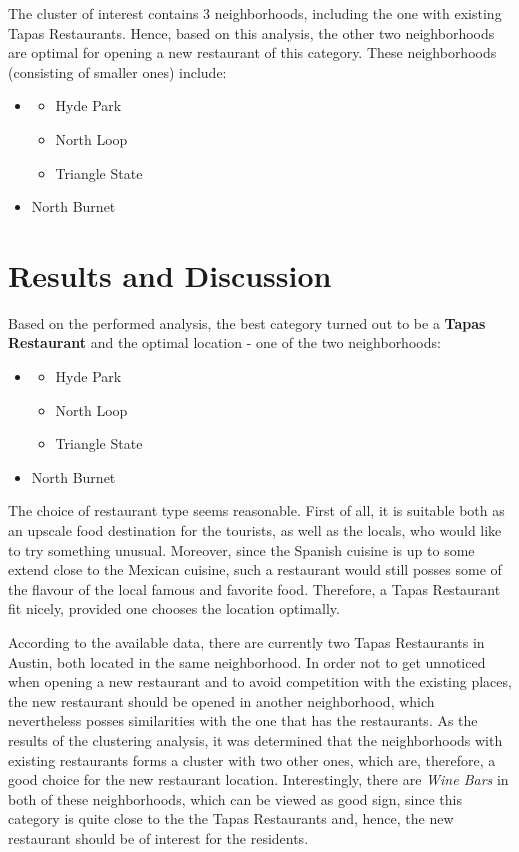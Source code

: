 \documentclass[11pt]{article}
\numberwithin{equation}{section}
\begin{document}
The cluster of interest contains 3 neighborhoods, including the one with existing Tapas Restaurants. Hence, based on this analysis, the other two neighborhoods are optimal for opening a new restaurant of this category. These neighborhoods (consisting of smaller ones) include:
{\bf
\begin{itemize}
\item \begin{itemize}
\item Hyde Park
\item North Loop
\item Triangle State
\end{itemize}
\item North Burnet
\end{itemize}
}

\section{Results and Discussion}
Based on the performed analysis, the best category turned out to be a {\bf Tapas Restaurant} and the optimal location - one of the two neighborhoods:
{\bf
\begin{itemize}
\item \begin{itemize}
\item Hyde Park
\item North Loop
\item Triangle State
\end{itemize}
\item North Burnet
\end{itemize}
}

The choice of restaurant type seems reasonable. First of all, it is suitable both as an upscale food destination for the tourists, as well as the locals, who would like to try something unusual. Moreover, since the Spanish cuisine is up to some extend close to the Mexican cuisine, such a restaurant would still posses some of the flavour of the local famous and favorite food. Therefore, a Tapas Restaurant fit nicely, provided one chooses the location optimally.

According to the available data, there are currently two Tapas Restaurants in Austin, both located in the same neighborhood. In order not to get unnoticed when opening a new restaurant and to avoid competition with the existing places, the new restaurant should be opened in another neighborhood, which nevertheless posses similarities with the one that has the restaurants. As the results of the clustering analysis, it was determined that the neighborhoods with existing restaurants forms a cluster with two other ones, which are, therefore, a good choice for the new restaurant location.  Interestingly, there are {\it Wine Bars} in both of these neighborhoods, which can be viewed as good sign, since this category is quite close to the the Tapas Restaurants and, hence, the new restaurant should be of interest for the residents.
\end{document}
